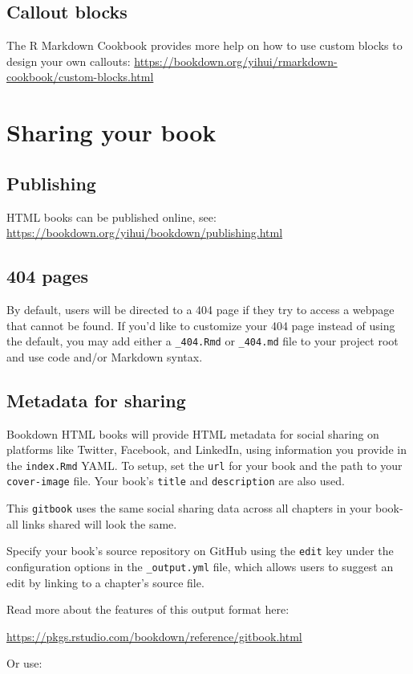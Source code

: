 \documentclass[
]{book}
\begin{document}
\hypertarget{callout-blocks}{%
\section{Callout blocks}\label{callout-blocks}}

The R Markdown Cookbook provides more help on how to use custom blocks to design your own callouts: \url{https://bookdown.org/yihui/rmarkdown-cookbook/custom-blocks.html}

\hypertarget{sharing-your-book}{%
\chapter{Sharing your book}\label{sharing-your-book}}

\hypertarget{publishing}{%
\section{Publishing}\label{publishing}}

HTML books can be published online, see: \url{https://bookdown.org/yihui/bookdown/publishing.html}

\hypertarget{pages}{%
\section{404 pages}\label{pages}}

By default, users will be directed to a 404 page if they try to access a webpage that cannot be found. If you'd like to customize your 404 page instead of using the default, you may add either a \texttt{\_404.Rmd} or \texttt{\_404.md} file to your project root and use code and/or Markdown syntax.

\hypertarget{metadata-for-sharing}{%
\section{Metadata for sharing}\label{metadata-for-sharing}}

Bookdown HTML books will provide HTML metadata for social sharing on platforms like Twitter, Facebook, and LinkedIn, using information you provide in the \texttt{index.Rmd} YAML. To setup, set the \texttt{url} for your book and the path to your \texttt{cover-image} file. Your book's \texttt{title} and \texttt{description} are also used.

This \texttt{gitbook} uses the same social sharing data across all chapters in your book- all links shared will look the same.

Specify your book's source repository on GitHub using the \texttt{edit} key under the configuration options in the \texttt{\_output.yml} file, which allows users to suggest an edit by linking to a chapter's source file.

Read more about the features of this output format here:

\url{https://pkgs.rstudio.com/bookdown/reference/gitbook.html}

Or use:

  
\end{document}
